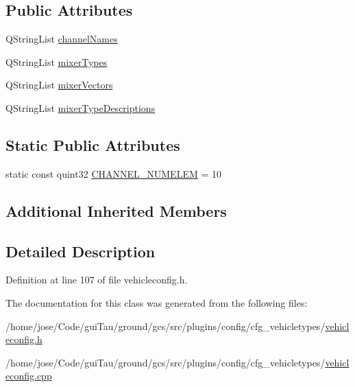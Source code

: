 \subsection*{Public Attributes}
\begin{DoxyCompactItemize}
\item 
Q\-String\-List \hyperlink{group___config_plugin_gaca881ae0a25d7e063b68a36b2f5576bf}{channel\-Names}
\item 
Q\-String\-List \hyperlink{group___config_plugin_ga494123875db35fe04e5a0512850e8c02}{mixer\-Types}
\item 
Q\-String\-List \hyperlink{group___config_plugin_ga0f47a1cc91e5a63c70f0802f3533e193}{mixer\-Vectors}
\item 
Q\-String\-List \hyperlink{group___config_plugin_ga05f4cbfd3c5b0fcc642f17003888459a}{mixer\-Type\-Descriptions}
\end{DoxyCompactItemize}
\subsection*{Static Public Attributes}
\begin{DoxyCompactItemize}
\item 
static const quint32 \hyperlink{group___config_plugin_ga1d29d6e305c146323af055bb3657059f}{C\-H\-A\-N\-N\-E\-L\-\_\-\-N\-U\-M\-E\-L\-E\-M} = 10
\end{DoxyCompactItemize}
\subsection*{Additional Inherited Members}


\subsection{Detailed Description}


Definition at line 107 of file vehicleconfig.\-h.



The documentation for this class was generated from the following files\-:\begin{DoxyCompactItemize}
\item 
/home/jose/\-Code/gui\-Tau/ground/gcs/src/plugins/config/cfg\-\_\-vehicletypes/\hyperlink{vehicleconfig_8h}{vehicleconfig.\-h}\item 
/home/jose/\-Code/gui\-Tau/ground/gcs/src/plugins/config/cfg\-\_\-vehicletypes/\hyperlink{vehicleconfig_8cpp}{vehicleconfig.\-cpp}\end{DoxyCompactItemize}
